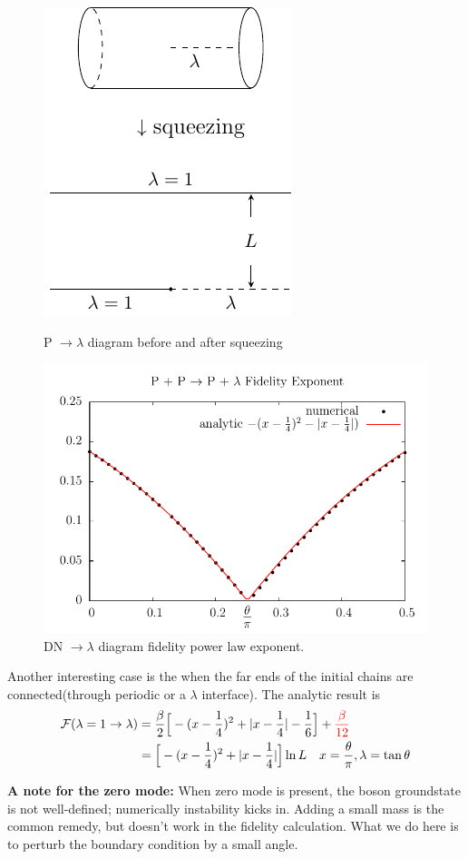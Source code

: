 \documentclass{article}
\begin{document}
\begin{figure}[!h]
\begin{minipage}[t]{0.3\linewidth}
\centering
\includegraphics[width=	extwidth]{fig_P-squeeze}\caption{P $\rightarrow \lambda$ diagram before and after squeezing}
\label{fig:P-squeeze}
\end{minipage}
\hfill
\begin{minipage}[t]{0.65\linewidth}
\centering
\includegraphics[width=\textwidth]{p_p2tan.pdf}
\caption{DN $\rightarrow \lambda$ diagram fidelity power law exponent.}
\end{minipage}
\end{figure}

Another interesting case is the when the far ends of the initial chains are connected(through periodic or a $\lambda$ interface). The analytic result is
\begin{equation}
\begin{aligned}
  \mathcal{F}( \lambda = 1 \rightarrow \lambda ) &=  \frac{\beta}{2}\Big[  -( x - \frac{1}{4} )^2  + | x - \frac{1}{4} | - \frac{1}{6} \Big]  + {\color{red} \frac{\beta}{12}} \\
  &= \Big[  -( x - \frac{1}{4} )^2  + | x - \frac{1}{4} | \Big]  \ln L \quad x = \frac{\theta}{\pi}, \lambda = \tan \theta 
\end{aligned}
\end{equation}

{\bf A note for the zero mode:} When zero mode is present, the boson groundstate is not well-defined; numerically instability kicks in. Adding a small mass is the common remedy, but doesn't work in the fidelity calculation. What we do here is to perturb the boundary condition by a small angle.
\end{document}
